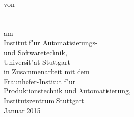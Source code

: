 \begin{titlepage}
\begin{center}
  \vspace{20mm}
         {\large \hspace{20mm} von}\\
  \vspace{5mm}
         {\large \hspace{20mm} \Author}\\
  \vspace{20mm}
  \makebox[40mm]{}\\
  \vspace{5mm}
  			 {\large \hspace{20mm} am}\\
  \vspace{5mm}
         {\large \hspace{20mm} Institut f"ur Automatisierungs-}\\
         {\large \hspace{20mm} und Softwaretechnik,}\\
         {\large \hspace{20mm} Universit"at Stuttgart} \\
  \vspace{5mm}
         {\large \hspace{20mm} in Zusammenarbeit mit dem} \\
  \vspace{5mm}
         {\large \hspace{20mm} Fraunhofer-Institut f"ur} \\
         {\large \hspace{20mm} Produktionstechnik und Automatisierung,} \\
         {\large \hspace{20mm} Institutszentrum Stuttgart} \\
  \vfill
         {\large \hspace{20mm} Januar 2015}
\end{center}
\end{titlepage}

\clearpage
\thispagestyle{empty}
\cleardoublepage